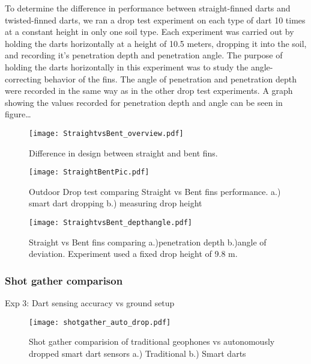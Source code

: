 To determine the difference in performance between straight-finned darts and twisted-finned darts, we ran a drop test experiment on each type of dart 10 times at a constant height in only one soil type. Each experiment was carried out by holding the darts horizontally at a height of 10.5 meters, dropping it into the soil, and recording it’s penetration depth and penetration angle.  The purpose of holding the darts horizontally in this experiment was to study the angle-correcting behavior of the fins. The angle of penetration and penetration depth were recorded in the same way as in the other drop test experiments. A graph showing the values recorded for penetration depth and angle can be seen in figure…
\begin{figure} \centering
  {\texttt{[image: StraightvsBent\_overview.pdf]}}
 \caption{Difference in design between straight and bent fins.} 
 \label{fig:StraightBentPic}
 \vspace{-1em}
\end{figure} 
\begin{figure} \centering
  {\texttt{[image: StraightBentPic.pdf]}}
 \caption{Outdoor Drop test comparing Straight vs Bent fins performance.
 a.)  smart dart dropping 
 b.)  measuring drop height} 
 \label{fig:StraightBentPic}
 \vspace{-1em}
\end{figure}
\begin{figure} \centering
  {\texttt{[image: StraightvsBent\_depthangle.pdf]}}
 \caption{Straight vs Bent fins comparing a.)penetration depth b.)angle of deviation. Experiment used a fixed drop height of 9.8 m.} 
 \label{fig:StraightBentDepth}
\end{figure}
\subsubsection{Shot gather comparison}
Exp 3: Dart sensing accuracy vs ground setup

\begin{figure} \centering
  {\texttt{[image: shotgather\_auto\_drop.pdf]}}
 \caption{Shot gather comparision of traditional geophones vs autonomously dropped smart dart sensors a.) Traditional b.) Smart darts} 
 \label{fig:TradvsAutoDrop}
\end{figure}

 